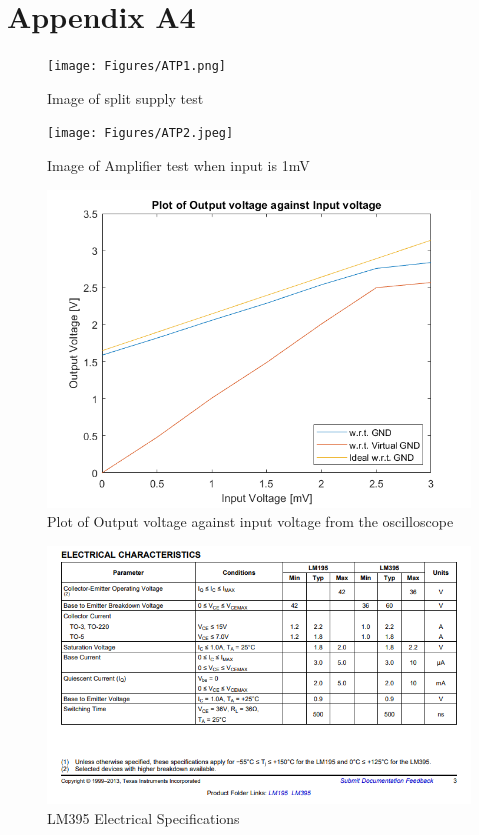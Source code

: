 \documentclass[class=report,11pt,crop=false]{standalone}
\begin{document}
	\chapter{Appendix A4}
	\begin{figure}[h!]
		\centering
		\texttt{[image: Figures/ATP1.png]}
		\caption{Image of split supply test}
		\label{fig:S7}
	\end{figure}
	\begin{figure}[h!]
		\centering
		\texttt{[image: Figures/ATP2.jpeg]}
		\caption{Image of Amplifier test when input is 1mV}
		\label{fig:S8}
	\end{figure}
	\begin{figure}[h!]
		\centering
		\includegraphics[width=0.4\linewidth]{Figures/Result1.png}
		\caption{Plot of Output voltage against input voltage from the oscilloscope}
		\label{fig:S11}
	\end{figure}
	\begin{figure}[h!]
		\centering
		\includegraphics[width=0.4\linewidth]{Figures/LM395 SPECS.png}
		\caption{LM395 Electrical Specifications}
		\label{fig:P5}
	\end{figure}
	\ifstandalone
	
	\printnoidxglossary[type=\acronymtype,nonumberlist]
	\fi
\end{document}
